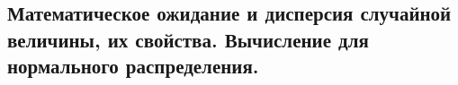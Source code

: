 \subsection{Математическое ожидание и дисперсия случайной величины, их свойства. Вычисление для нормального распределения.}
